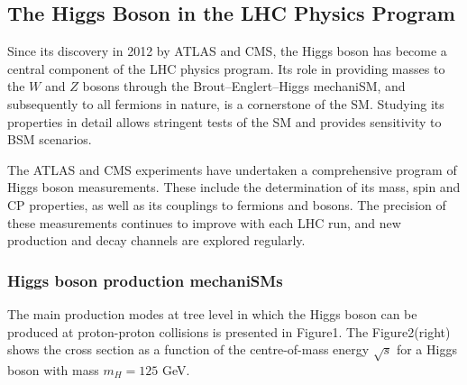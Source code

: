 \documentclass[11pt,twoside]{book}
\begin{document}
\subsection{The Higgs Boson in the LHC Physics Program}
\label{sec:higgs_program}

Since its discovery in 2012 by ATLAS and CMS, the Higgs boson has become a central component of the LHC physics program. Its role in providing masses to the $W$ and $Z$ bosons through the Brout–Englert–Higgs mechani\acrshort{SM}, and subsequently to all fermions in nature, is a cornerstone of the \acrshort{SM}. Studying its properties in detail allows stringent tests of the \acrshort{SM} and provides sensitivity to B\acrshort{SM} scenarios.

The ATLAS and CMS experiments have undertaken a comprehensive program of Higgs boson measurements. These include the determination of its mass, spin and CP properties, as well as its couplings to fermions and bosons. The precision of these measurements continues to improve with each LHC run, and new production and decay channels are explored regularly.

\subsubsection*{Higgs boson production mechani\acrshort{SM}s}
\label{sec:higgs_production}
The main production modes at tree level in which the Higgs boson can be produced at proton-proton collisions is presented in Figure1. The Figure2(right) shows the cross section as a function of the centre-of-mass energy $\sqrt s$ for a Higgs boson with mass $m_{H}=125$ GeV.
\end{document}

